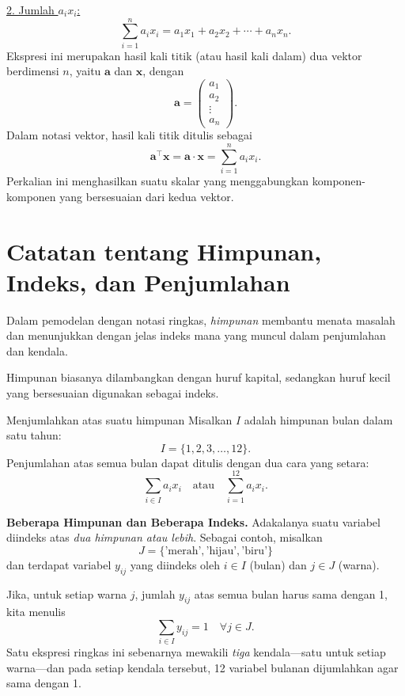 \underline{2. Jumlah \(a_i x_i\):}
\[
\sum_{i=1}^{n} a_i x_i = a_1x_1 + a_2x_2 + \cdots + a_nx_n.
\]
Ekspresi ini merupakan hasil kali titik (atau hasil kali dalam) dua vektor berdimensi \(n\), yaitu \(\mathbf{a}\) dan \(\mathbf{x}\), dengan
\[
\mathbf{a} = \begin{pmatrix} a_1 \\ a_2 \\ \vdots \\ a_n \end{pmatrix}.
\]
Dalam notasi vektor, hasil kali titik ditulis sebagai
\[
\mathbf{a}^\top \mathbf{x} = \mathbf{a} \cdot \mathbf{x} = \sum_{i=1}^{n} a_i x_i.
\]
Perkalian ini menghasilkan suatu skalar yang menggabungkan komponen-komponen yang bersesuaian dari kedua vektor.

\section*{Catatan tentang Himpunan, Indeks, dan Penjumlahan}

Dalam pemodelan dengan notasi ringkas, \emph{himpunan} membantu menata masalah dan menunjukkan dengan jelas indeks mana yang muncul dalam penjumlahan dan kendala.

Himpunan biasanya dilambangkan dengan huruf kapital, sedangkan huruf kecil yang bersesuaian digunakan sebagai indeks.  

\begin{example}{Menjumlahkan atas suatu himpunan}{}
Misalkan \( I \) adalah himpunan bulan dalam satu tahun:
\[
I = \{1, 2, 3, \dots, 12\}.
\]
Penjumlahan atas semua bulan dapat ditulis dengan dua cara yang setara:
\[
\sum_{i \in I} a_i x_i \quad\text{atau}\quad \sum_{i=1}^{12} a_i x_i.
\]
\end{example}

\medskip
\noindent
\textbf{Beberapa Himpunan dan Beberapa Indeks.}  
Adakalanya suatu variabel diindeks atas \emph{dua himpunan atau lebih}.  
Sebagai contoh, misalkan
\[
J = \{\text{'merah'}, \text{'hijau'}, \text{'biru'}\}
\]
dan terdapat variabel \( y_{ij} \) yang diindeks oleh \( i \in I \) (bulan) dan \( j \in J \) (warna).

Jika, untuk setiap warna \(j\), jumlah \(y_{ij}\) atas semua bulan harus sama dengan 1, kita menulis
\[
\sum_{i \in I} y_{ij} = 1 \quad \forall j \in J.
\]
Satu ekspresi ringkas ini sebenarnya mewakili \emph{tiga} kendala—satu untuk setiap warna—dan pada setiap kendala tersebut, 12 variabel bulanan dijumlahkan agar sama dengan 1.

